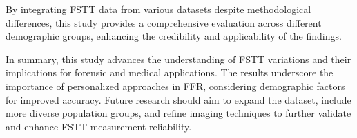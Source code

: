 \documentclass[journal,article,submit,pdftex,moreauthors]{Definitions/mdpi}
\begin{document}
By integrating FSTT data from various datasets despite methodological differences, this study provides a comprehensive evaluation across different demographic groups, enhancing the credibility and applicability of the findings.

In summary, this study advances the understanding of FSTT variations and their implications for forensic and medical applications. The results underscore the importance of personalized approaches in FFR, considering demographic factors for improved accuracy. Future research should aim to expand the dataset, include more diverse population groups, and refine imaging techniques to further validate and enhance FSTT measurement reliability.

\vspace{6pt} 



\end{document}
